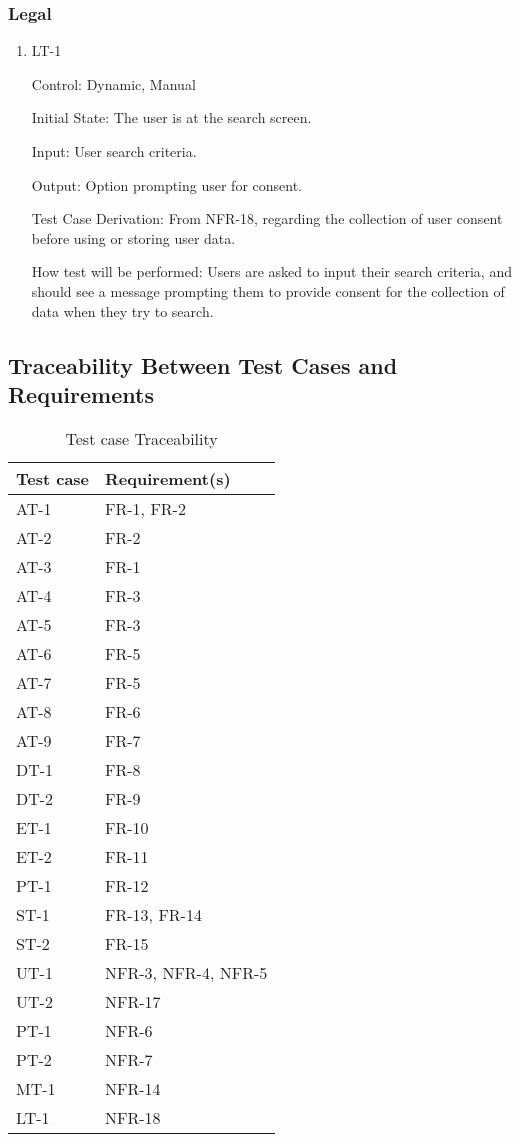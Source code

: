 \documentclass[12pt, titlepage]{article}
\begin{document}
\subsubsection{Legal}

\begin{enumerate}
\item{LT-1}

Control: Dynamic, Manual
					
Initial State: The user is at the search screen.

Input: User search criteria.

Output: Option prompting user for consent.

Test Case Derivation: From NFR-18, regarding the collection of user consent before using or storing user data.

How test will be performed: Users are asked to input their search criteria, and should see a message prompting them to provide consent for the collection of data when they try to search.

\end{enumerate}

\subsection{Traceability Between Test Cases and Requirements}

\begin{table}[H]
  \caption{Test case Traceability}
  \begin{tabular}{|p{7cm}|p{7cm}|}
  \hline
  Test case & Requirement(s)\\
  \hline
  AT-1 & FR-1, FR-2\\
  \hline
  AT-2 & FR-2\\
  \hline
  AT-3 & FR-1\\
  \hline
  AT-4 & FR-3\\
  \hline
  AT-5 & FR-3\\
  \hline
  AT-6 & FR-5\\
  \hline
  AT-7 & FR-5\\
  \hline
  AT-8 & FR-6\\
  \hline
  AT-9 & FR-7\\
  \hline
  DT-1 & FR-8\\
  \hline
  DT-2 & FR-9\\
  \hline
  ET-1 & FR-10\\
  \hline
  ET-2 & FR-11\\
  \hline
  PT-1 & FR-12\\
  \hline
  ST-1 & FR-13, FR-14\\
  \hline
  ST-2 & FR-15\\
  \hline
  UT-1 & NFR-3, NFR-4, NFR-5\\
  \hline
  UT-2 & NFR-17\\
  \hline
  PT-1 & NFR-6\\
  \hline
  PT-2 & NFR-7\\
  \hline
 MT-1 & NFR-14\\
  \hline
 LT-1 & NFR-18\\
  \hline
  \end{tabular}
\end{table}
\end{document}
